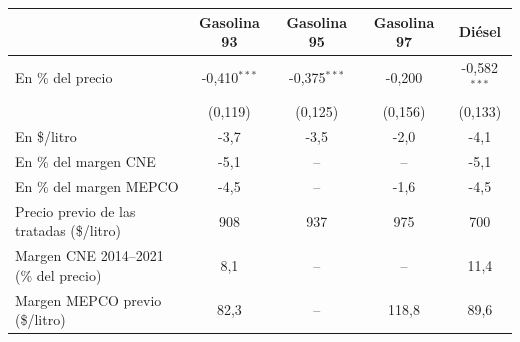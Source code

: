 \begin{tabular}{lcccc}
\toprule
 & Gasolina 93 & Gasolina 95 & Gasolina 97 & Diésel \\
\midrule
En \% del precio & -0{,}410$^{***}$ & -0{,}375$^{***}$ & -0{,}200 & -0{,}582$^{***}$ \\
 & (0{,}119) & (0{,}125) & (0{,}156) & (0{,}133) \\
En \$/litro & -3{,}7 & -3{,}5 & -2{,}0 & -4{,}1 \\
En \% del margen CNE & -5{,}1 & -- & -- & -5{,}1 \\
En \% del margen MEPCO & -4{,}5 & -- & -1{,}6 & -4{,}5 \\
\midrule
Precio previo de las tratadas (\$/litro) & 908 & 937 & 975 & 700 \\
Margen CNE 2014--2021 (\% del precio) & 8{,}1 & -- & -- & 11{,}4 \\
Margen MEPCO previo (\$/litro) & 82{,}3 & -- & 118{,}8 & 89{,}6 \\
\bottomrule
\end{tabular}
